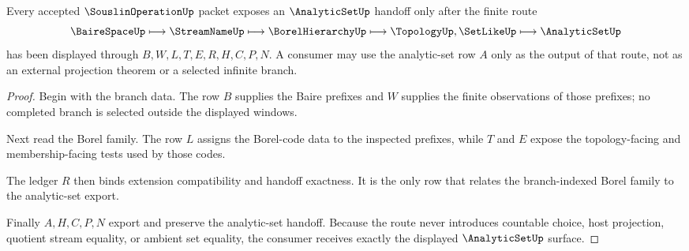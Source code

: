 \begin{theorem}
\label{thm:souslin-operation-analytic-set-handoff}
Every accepted $\SouslinOperationUp$ packet exposes an $\AnalyticSetUp$ handoff only after the finite route
$$
\BaireSpaceUp \longmapsto \StreamNameUp \longmapsto \BorelHierarchyUp \longmapsto \TopologyUp,\SetLikeUp \longmapsto \AnalyticSetUp
$$
has been displayed through $B,W,L,T,E,R,H,C,P,N$. A consumer may use the analytic-set row $A$ only as the output of that route, not as an external projection theorem or a selected infinite branch.
\end{theorem}
\begin{proof}
Begin with the branch data. The row $B$ supplies the Baire prefixes and $W$ supplies the finite observations of those prefixes; no completed branch is selected outside the displayed windows.

Next read the Borel family. The row $L$ assigns the Borel-code data to the inspected prefixes, while $T$ and $E$ expose the topology-facing and membership-facing tests used by those codes.

The ledger $R$ then binds extension compatibility and handoff exactness. It is the only row that relates the branch-indexed Borel family to the analytic-set export.

Finally $A,H,C,P,N$ export and preserve the analytic-set handoff. Because the route never introduces countable choice, host projection, quotient stream equality, or ambient set equality, the consumer receives exactly the displayed $\AnalyticSetUp$ surface.
\end{proof}

\begin{closurestatus}{\SouslinOperationUp}
  \theoryclosure{\seedClosure}
  \formalstatus{\unformalizedV}
\end{closurestatus}
